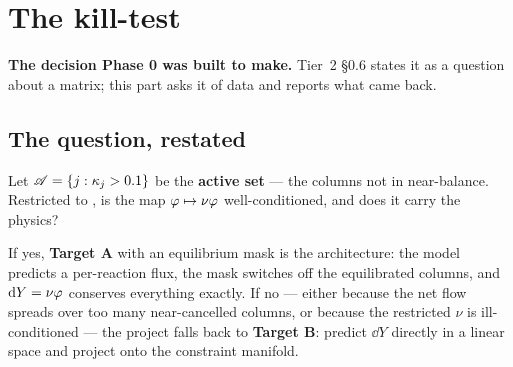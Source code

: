 %
%

\section{The kill-test}
\label{part:killtest}

\textbf{The decision Phase 0 was built to make.} Tier~2 \S 0.6 states it as a
question about a matrix; this part asks it of data and reports what came back.

\subsection{The question, restated}
\label{sec:question}

\begin{invariant}
Let $\mathscr{A} = \{j : \kappa_j > 0.1\}$ be the \textbf{active set} --- the columns
not in near-balance. Restricted to \aff, is the map $\varphi \mapsto
\nu\varphi$ well-conditioned, and does it carry the physics?
\end{invariant}

If yes, \textbf{Target A} with an equilibrium mask is the architecture: the
model predicts a per-reaction flux, the mask switches off the equilibrated
columns, and $\mathrm{d} Y = \nu\varphi$ conserves everything exactly. If no ---
either because the net flow spreads over too many near-cancelled columns, or
because the restricted $\nu$ is ill-conditioned --- the project falls back to
\textbf{Target B}: predict $\dd Y$ directly in a linear space and project onto
the constraint manifold.

